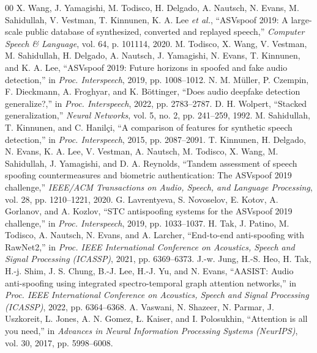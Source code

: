 \documentclass[conference]{IEEEtran}
\begin{document}
\begin{thebibliography}{00}
 X. Wang, J. Yamagishi, M. Todisco, H. Delgado, A. Nautsch, N. Evans, M. Sahidullah, V. Vestman, T. Kinnunen, K. A. Lee \textit{et al.}, ``ASVspoof 2019: A large-scale public database of synthesized, converted and replayed speech,'' \textit{Computer Speech \& Language}, vol. 64, p. 101114, 2020.
 M. Todisco, X. Wang, V. Vestman, M. Sahidullah, H. Delgado, A. Nautsch, J. Yamagishi, N. Evans, T. Kinnunen, and K. A. Lee, ``ASVspoof 2019: Future horizons in spoofed and fake audio detection,'' in \textit{Proc. Interspeech}, 2019, pp. 1008--1012.
 N. M. M\"uller, P. Czempin, F. Dieckmann, A. Froghyar, and K. B\"ottinger, ``Does audio deepfake detection generalize?,'' in \textit{Proc. Interspeech}, 2022, pp. 2783--2787.
 D. H. Wolpert, ``Stacked generalization,'' \textit{Neural Networks}, vol. 5, no. 2, pp. 241--259, 1992.
 M. Sahidullah, T. Kinnunen, and C. Hanil\c{c}i, ``A comparison of features for synthetic speech detection,'' in \textit{Proc. Interspeech}, 2015, pp. 2087--2091.
 T. Kinnunen, H. Delgado, N. Evans, K. A. Lee, V. Vestman, A. Nautsch, M. Todisco, X. Wang, M. Sahidullah, J. Yamagishi, and D. A. Reynolds, ``Tandem assessment of speech spoofing countermeasures and biometric authentication: The ASVspoof 2019 challenge,'' \textit{IEEE/ACM Transactions on Audio, Speech, and Language Processing}, vol. 28, pp. 1210--1221, 2020.
 G. Lavrentyeva, S. Novoselov, E. Kotov, A. Gorlanov, and A. Kozlov, ``STC antispoofing systems for the ASVspoof 2019 challenge,'' in \textit{Proc. Interspeech}, 2019, pp. 1033--1037.
 H. Tak, J. Patino, M. Todisco, A. Nautsch, N. Evans, and A. Larcher, ``End-to-end anti-spoofing with RawNet2,'' in \textit{Proc. IEEE International Conference on Acoustics, Speech and Signal Processing (ICASSP)}, 2021, pp. 6369--6373.
 J.-w. Jung, H.-S. Heo, H. Tak, H.-j. Shim, J. S. Chung, B.-J. Lee, H.-J. Yu, and N. Evans, ``AASIST: Audio anti-spoofing using integrated spectro-temporal graph attention networks,'' in \textit{Proc. IEEE International Conference on Acoustics, Speech and Signal Processing (ICASSP)}, 2022, pp. 6364--6368.
 A. Vaswani, N. Shazeer, N. Parmar, J. Uszkoreit, L. Jones, A. N. Gomez, \L. Kaiser, and I. Polosukhin, ``Attention is all you need,'' in \textit{Advances in Neural Information Processing Systems (NeurIPS)}, vol. 30, 2017, pp. 5998--6008.

\end{thebibliography}
\end{document}
